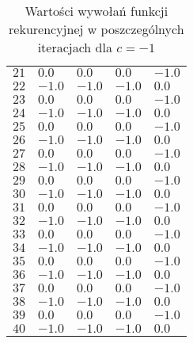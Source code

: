 \documentclass[12pt]{article}
\begin{document}
\begin{table}[h!]
\begin{tabularx}{0.9\textwidth}{l l l l l}
            $21$ & $0.0$ & $0.0$ & $0.0$ & $-1.0$ \\
            $22$ & $-1.0$ & $-1.0$ & $-1.0$ & $0.0$ \\
            $23$ & $0.0$ & $0.0$ & $0.0$ & $-1.0$ \\
            $24$ & $-1.0$ & $-1.0$ & $-1.0$ & $0.0$ \\
            $25$ & $0.0$ & $0.0$ & $0.0$ & $-1.0$ \\
            $26$ & $-1.0$ & $-1.0$ & $-1.0$ & $0.0$ \\
            $27$ & $0.0$ & $0.0$ & $0.0$ & $-1.0$ \\
            $28$ & $-1.0$ & $-1.0$ & $-1.0$ & $0.0$ \\
            $29$ & $0.0$ & $0.0$ & $0.0$ & $-1.0$ \\
            $30$ & $-1.0$ & $-1.0$ & $-1.0$ & $0.0$ \\
            $31$ & $0.0$ & $0.0$ & $0.0$ & $-1.0$ \\
            $32$ & $-1.0$ & $-1.0$ & $-1.0$ & $0.0$ \\
            $33$ & $0.0$ & $0.0$ & $0.0$ & $-1.0$ \\
            $34$ & $-1.0$ & $-1.0$ & $-1.0$ & $0.0$ \\
            $35$ & $0.0$ & $0.0$ & $0.0$ & $-1.0$ \\
            $36$ & $-1.0$ & $-1.0$ & $-1.0$ & $0.0$ \\
            $37$ & $0.0$ & $0.0$ & $0.0$ & $-1.0$ \\
            $38$ & $-1.0$ & $-1.0$ & $-1.0$ & $0.0$ \\
            $39$ & $0.0$ & $0.0$ & $0.0$ & $-1.0$ \\
            $40$ & $-1.0$ & $-1.0$ & $-1.0$ & $0.0$ \\
            \hline
        \end{tabularx}
        \label{table:ex6_c_1}
        \caption{Wartości wywołań funkcji rekurencyjnej w poszczególnych iteracjach dla $c = -1$}
    \end{table}

\newpage
\end{document}
